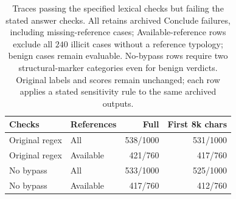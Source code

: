 \begin{table}[!ht]
\centering\small
\setlength{\tabcolsep}{3pt}
\begin{tabular}{llrr}
\toprule
\textbf{Checks} & \textbf{References} & \textbf{Full} & \textbf{First 8k chars} \\
\midrule
Original regex & All & 538/1000 & 531/1000 \\
Original regex & Available & 421/760 & 417/760 \\
No bypass & All & 533/1000 & 525/1000 \\
No bypass & Available & 417/760 & 412/760 \\
\bottomrule\end{tabular}
\caption{Traces passing the specified lexical checks but failing the stated answer
checks. All retains archived Conclude failures, including missing-reference cases;
Available-reference rows exclude all $240$ illicit cases without a
reference typology; benign cases remain evaluable. No-bypass rows require two
structural-marker categories even for benign verdicts. Original labels and scores
remain unchanged; each row applies a stated sensitivity rule to the same archived outputs.}
\label{tab:audit_sensitivity_rules}
\end{table}

